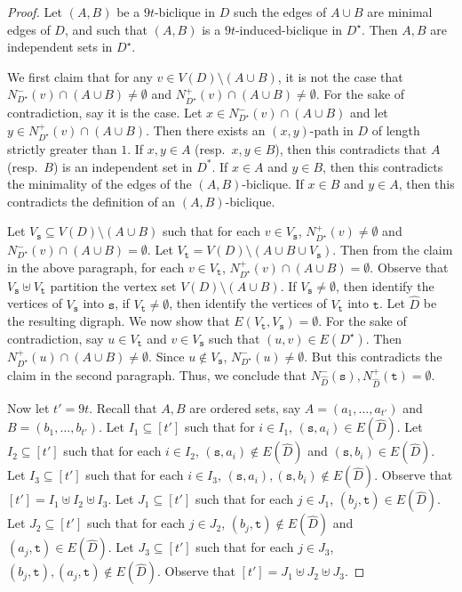 \documentclass[a4paper,11pt]{article}
\theoremstyle{plain}
\newtheorem{identification rule}{Identification Rule}
\theoremstyle{definition}
\theoremstyle{remark}
\newcommand{\sss}{\texttt{s}}
\newcommand{\ttt}{\texttt{t}}
\begin{document}
\begin{proof}
Let $(A,B)$ be a $9t$-biclique in $D$ such the edges of $A \cup B$ are minimal edges of $D$, and such that $(A,B)$ is a $9t$-induced-biclique in $D^{\star}$. Then $A,B$ are independent sets in $D^{\star}$.

We first claim that for any $v \in V(D) \setminus (A \cup B)$, it is not the case that 
$N^-_{D^{\star}}(v) \cap (A \cup B) \neq \emptyset$ and $N^+_{D^{\star}}(v) \cap (A \cup B)\neq \emptyset$. For the sake of contradiction, say it is the case. Let $x \in N^-_{D^{\star}}(v) \cap (A \cup B)$ and let $y \in N^+_{D^{\star}}(v) \cap (A \cup B)$. Then there exists an $(x,y)$-path in $D$ of length strictly greater than $1$. If $x,y \in A$ (resp.~$x,y \in B$), then this contradicts that $A$ (resp.~$B$) is an independent set in $D^*$. If $x \in A$ and $y \in B$, then this contradicts the minimality of the edges of the $(A,B)$-biclique. If $x \in B$ and $y \in A$, then this contradicts the definition of an $(A,B)$-biclique.

Let $V_{\sss} \subseteq V(D) \setminus (A \cup B)$ such that for each $v \in V_{\sss}$, $N^+_{D^{\star}}(v) \neq \emptyset$ and $N^-_{D^{\star}}(v)  \cap (A \cup B)=\emptyset$.
Let $V_{\ttt} = V(D) \setminus (A \cup B \cup V_{\sss})$. Then from the claim in the above paragraph, 
for each $v \in V_{\ttt}$, $N^+_{D^{\star}}(v) \cap (A \cup B)=\emptyset$. 
Observe that $V_{\sss} \uplus V_{\ttt}$ partition the vertex set $V(D) \setminus (A \cup B)$. If $V_{\sss} \neq  \emptyset$, then identify the vertices of $V_{\sss}$ into $\sss$, if $V_{\ttt} \neq \emptyset$, then identify the vertices of $V_{\ttt}$ into $\ttt$. Let $\widehat{D}$ be the resulting digraph. 
We now show that $E(V_{\ttt}, V_{\sss}) =\emptyset$. For the sake of contradiction, say $u \in V_{\ttt}$ and $v \in V_{\sss}$ such that $(u,v) \in E(D^{\star})$. Then $N^+_{D^{\star}}(u) \cap (A \cup B) \neq \emptyset$.
Since $u \not \in V_{\sss}$, $N^-_{D^{\star}}(u) \neq \emptyset$. But this contradicts the claim in the second paragraph. Thus, we conclude that $N^-_{\widehat{D}}(\sss), N^+_{\widehat{D}}(\ttt) = \emptyset$.


Now let $t' = 9t$.
Recall that $A,B$ are ordered sets, say $A=(a_1, \ldots, a_{t'})$ and $B=(b_1, \ldots, b_{t'})$.
Let $I_1 \subseteq [t']$ such that for $i \in I_1$, $(\sss,a_i) \in E(\widehat{D})$. Let $I_2 \subseteq [t']$ such that for each $i \in I_2$, $(\sss,a_i) \not \in  E(\widehat{D})$ and $(\sss,b_i) \in E(\widehat{D})$. Let $I_3 \subseteq [t']$ such that for each $i \in I_3$, $(\sss,a_i), (\sss,b_i) \not \in E(\widehat{D})$. Observe that $[t']=I_1 \uplus I_2 \uplus I_3$. 
Let $J_1 \subseteq [t']$ such that for each $j \in J_1$, $(b_j,\ttt) \in E(\widehat{D})$. Let $J_2 \subseteq [t']$ such that for each $j \in J_2$, $(b_j , \ttt) \not \in E(\widehat{D})$ and $(a_j,\ttt) \in E(\widehat{D})$. Let $J_3 \subseteq [t']$ such that for each $j \in J_3$, $(b_j , \ttt), (a_j,\ttt) \not \in E(\widehat{D})$. Observe that $[t'] = J_1 \uplus J_2 \uplus J_3$.


\end{proof}
\end{document}
